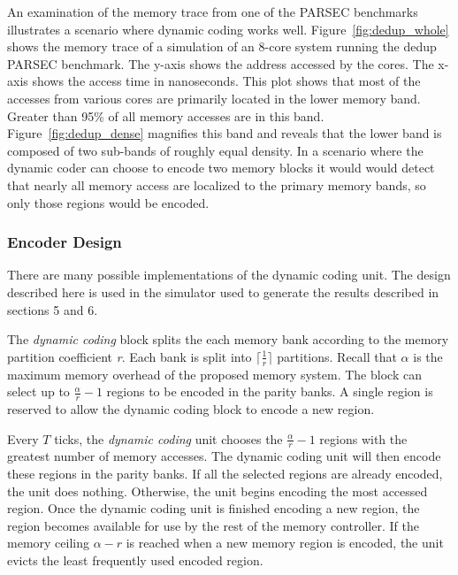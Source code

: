 An examination of the memory trace from one of the PARSEC benchmarks illustrates a scenario where dynamic coding works well. Figure~\ref{fig:dedup_whole} shows the memory trace of a simulation of an 8-core system running the dedup PARSEC benchmark. The y-axis shows the address accessed by the cores. The x-axis shows the access time in nanoseconds. This plot shows that most of the accesses from various cores are primarily located in the lower memory band. Greater than 95\% of all memory accesses are in this band. Figure~\ref{fig:dedup_dense} magnifies this band and reveals that the lower band is composed of two sub-bands of roughly equal density. In a scenario where the dynamic coder can choose to encode two memory blocks it would  would detect that nearly all memory access are localized to the primary memory bands, so only those regions would be encoded.

\subsubsection{Encoder Design}
There are many possible implementations of the dynamic coding unit. The design described here is used in the simulator used to generate the results described in sections 5 and 6.

The {\em dynamic coding} block splits the each memory bank according to the memory partition coefficient {\em r}. Each bank is split into $\lceil\frac{1}{r}\rceil$ partitions. Recall that $\alpha$ is the maximum memory overhead of the proposed memory system. The block can select up to $\frac{\alpha}{r} - 1$ regions to be encoded in the parity banks. A single region is reserved to allow the dynamic coding block to encode a new region.

Every $T$ ticks, the {\em dynamic coding} unit chooses the $\frac{\alpha}{r} - 1$ regions with the greatest number of memory accesses. The dynamic coding unit will then encode these regions in the parity banks. If all the selected regions are already encoded, the unit does nothing. Otherwise, the unit begins encoding the most accessed region. Once the dynamic coding unit is finished encoding a new region, the region becomes available for use by the rest of the memory controller. If the memory ceiling $\alpha - r$ is reached when a new memory region is encoded, the unit evicts the least frequently used encoded region.

